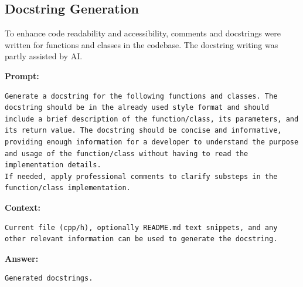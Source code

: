 \subsection*{Docstring Generation}

To enhance code readability and accessibility, comments and docstrings were written for functions and classes in the codebase. 
The docstring writing was partly assisted by AI.

\textbf{Prompt:}
\begin{lstlisting}[language={}, breaklines=true]
Generate a docstring for the following functions and classes. The docstring should be in the already used style format and should include a brief description of the function/class, its parameters, and its return value. The docstring should be concise and informative, providing enough information for a developer to understand the purpose and usage of the function/class without having to read the implementation details.
If needed, apply professional comments to clarify substeps in the function/class implementation.
\end{lstlisting}

\textbf{Context:}
\begin{lstlisting}[language={}, breaklines=true]
Current file (cpp/h), optionally README.md text snippets, and any other relevant information can be used to generate the docstring.
\end{lstlisting}

\textbf{Answer:}
\begin{lstlisting}[language={}, breaklines=true]
Generated docstrings.
\end{lstlisting}
